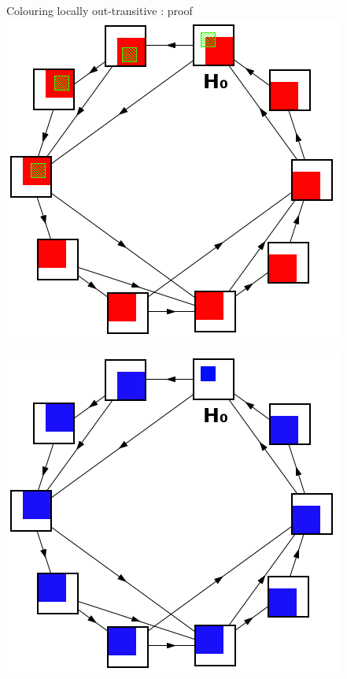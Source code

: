 \documentclass{beamer}
\begin{document}
\begin{frame}{Colouring locally out-transitive : proof}
 {
\centering
\includegraphics[scale=0.5]{Images/decomposition_with_tournament.png}
}

 {
\centering
\includegraphics[scale=0.5]{Images/decomposition_with_choice.png}
}


\end{frame}
\end{document}
